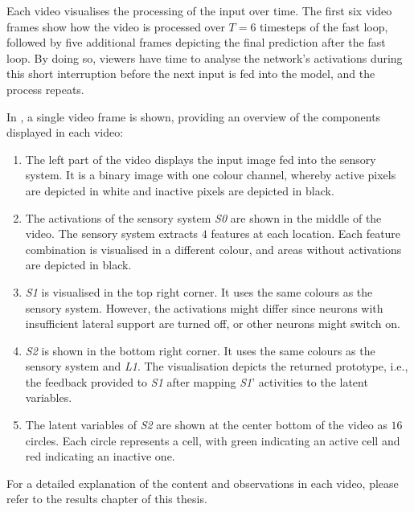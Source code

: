 Each video visualises the processing of the input over time.
The first six video frames show how the video is processed over $T=6$ timesteps of the fast loop, followed by five additional frames depicting the final prediction after the fast loop.
By doing so, viewers have time to analyse the network's activations during this short interruption before the next input is fed into the model, and the process repeats.

In , a single video frame is shown, providing an overview of the components displayed in each video:
\begin{enumerate}
    \item The left part of the video displays the input image fed into the sensory system. It is a binary image with one colour channel, whereby active pixels are depicted in white and inactive pixels are depicted in black.
    \item The activations of the sensory system \emph{S0} are shown in the middle of the video. The sensory system extracts $4$ features at each location. Each feature combination is visualised in a different colour, and areas without activations are depicted in black.
    \item \emph{S1} is visualised in the top right corner. It uses the same colours as the sensory system. However, the activations might differ since neurons with insufficient lateral support are turned off, or other neurons might switch on.
    \item \emph{S2} is shown in the bottom right corner. It uses the same colours as the sensory system and \emph{L1}. The visualisation depicts the returned prototype, i.e., the feedback provided to \emph{S1} after mapping \emph{S1}' activities to the latent variables.
    \item The latent variables of \emph{S2} are shown at the center bottom of the video as $16$ circles. Each circle represents a cell, with green indicating an active cell and red indicating an inactive one. 
\end{enumerate}

For a detailed explanation of the content and observations in each video, please refer to the results chapter of this thesis.

